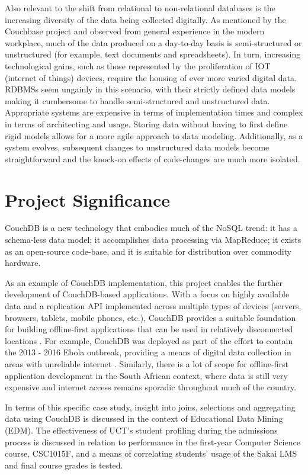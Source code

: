 Also relevant to the shift from relational to non-relational databases is the increasing diversity of the data being collected digitally. As mentioned by the Couchbase project \cite{couchbaseWhitePaper} and observed from general experience in the modern workplace, much of the data produced on a day-to-day basis is semi-structured or unstructured (for example, text documents and spreadsheets). In turn, increasing technological gains, such as those represented by the proliferation of IOT (internet of things) devices, require the housing of ever more varied digital data. RDBMSs seem ungainly in this scenario, with their strictly defined data models making it cumbersome to handle semi-structured and unstructured data. Appropriate systems are expensive in terms of implementation times and complex in terms of architecting and usage. Storing data without having to first define rigid models allows for a more agile approach to data modeling.  Additionally, as a system evolves, subsequent changes to unstructured data models become straightforward and the knock-on effects of code-changes are much more isolated.

\section{Project Significance}
CouchDB is a new technology that embodies much of the NoSQL trend: it has a schema-less data model; it accomplishes data processing via MapReduce; it exists as an open-source code-base, and it is suitable for distribution over commodity hardware.

As an example of CouchDB implementation, this project enables the further development of CouchDB-based applications. With a focus on highly available data and a replication API implemented across multiple types of devices (servers, browsers, tablets, mobile phones, etc.), CouchDB provides a suitable foundation for building offline-first applications that can be used in relatively disconnected locations \cite{ebola2017}. For example, CouchDB was deployed as part of the effort to contain the 2013 - 2016 Ebola outbreak, providing a means of digital data collection in areas with unreliable internet \cite{ebola2017}. Similarly, there is a lot of scope for offline-first application development in the South African context, where data is still very expensive and internet access remains sporadic throughout much of the country.

In terms of this specific case study, insight into joins, selections and aggregating data using CouchDB is discussed in the context of Educational Data Mining (EDM). The effectiveness of UCT's student profiling during the admissions process is discussed in relation to performance in the first-year Computer Science course, CSC1015F, and a means of correlating students’ usage of the Sakai LMS and final course grades is tested.

